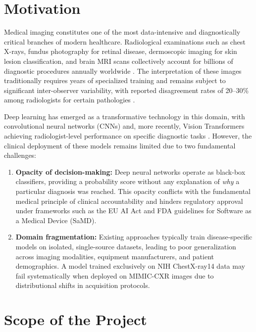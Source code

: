 \documentclass[12pt,a4paper]{report}
\begin{document}
\section{Motivation}

Medical imaging constitutes one of the most data-intensive and diagnostically critical branches of modern healthcare. Radiological examinations such as chest X-rays, fundus photography for retinal disease, dermoscopic imaging for skin lesion classification, and brain MRI scans collectively account for billions of diagnostic procedures annually worldwide \cite{rajpurkar2017chexnet}. The interpretation of these images traditionally requires years of specialized training and remains subject to significant inter-observer variability, with reported disagreement rates of 20--30\% among radiologists for certain pathologies \cite{bruno2015understanding}.

Deep learning has emerged as a transformative technology in this domain, with convolutional neural networks (CNNs) and, more recently, Vision Transformers achieving radiologist-level performance on specific diagnostic tasks \cite{dosovitskiy2020image, liu2021swin}. However, the clinical deployment of these models remains limited due to two fundamental challenges:

\begin{enumerate}[label=(\roman*)]
    \item \textbf{Opacity of decision-making:} Deep neural networks operate as black-box classifiers, providing a probability score without any explanation of \textit{why} a particular diagnosis was reached. This opacity conflicts with the fundamental medical principle of clinical accountability and hinders regulatory approval under frameworks such as the EU AI Act and FDA guidelines for Software as a Medical Device (SaMD).
    
    \item \textbf{Domain fragmentation:} Existing approaches typically train disease-specific models on isolated, single-source datasets, leading to poor generalization across imaging modalities, equipment manufacturers, and patient demographics. A model trained exclusively on NIH ChestX-ray14 data may fail systematically when deployed on MIMIC-CXR images due to distributional shifts in acquisition protocols.
\end{enumerate}

\section{Scope of the Project}
\end{document}
